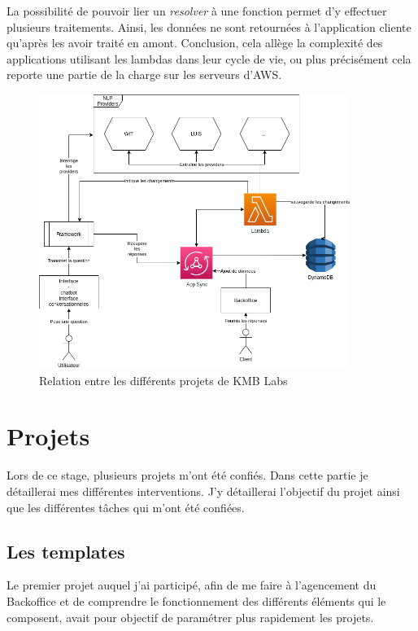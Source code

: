 \documentclass[12pt,a4paper,oneside]{scrreprt}
\begin{document}
La possibilité de pouvoir lier un \textit{resolver} à une fonction permet d'y effectuer plusieurs traitements. Ainsi, les données ne sont retournées à l'application cliente qu'après les avoir traité en amont. Conclusion, cela allège la complexité des applications utilisant les lambdas dans leur cycle de vie, ou plus précisément cela reporte une partie de la charge sur les serveurs d'AWS.

\begin{figure}[!ht]
	\centering
	\includegraphics[width=0.9\textwidth]{pictures/kmb_univers.png}
	\caption{Relation entre les différents projets de KMB Labs}
\end{figure}

\chapter{Projets}

Lors de ce stage, plusieurs projets m'ont été confiés. Dans cette partie je détaillerai mes différentes interventions. J'y détaillerai l'objectif du projet ainsi que les différentes tâches qui m'ont été confiées.

\section{Les templates}

Le premier projet auquel j'ai participé, afin de me faire à l'agencement du Backoffice et de comprendre le fonctionnement des différents éléments qui le composent, avait pour objectif de paramétrer plus rapidement les projets.
\end{document}
